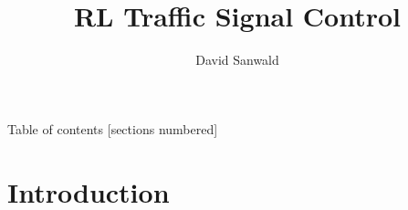\documentclass[10pt]{beamer}
\title{RL Traffic Signal Control}
\author{David Sanwald}
\begin{document}
\maketitle

\begin{frame}{Table of contents}
  [sections numbered]
  \tableofcontents[hideallsubsections]
\end{frame}

\section{Introduction}




\end{document}
